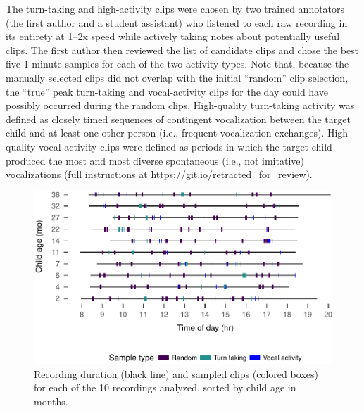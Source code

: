 \documentclass[floatsintext,man]{apa6}
\theoremstyle{definition}
\theoremstyle{definition}
\theoremstyle{definition}
\theoremstyle{remark}
\begin{document}
The turn-taking and high-activity clips were chosen by two trained
annotators (the first author and a student assistant) who listened to
each raw recording in its entirety at 1--2x speed while actively taking
notes about potentially useful clips. The first author then reviewed the
list of candidate clips and chose the best five 1-minute samples for
each of the two activity types. Note that, because the manually selected
clips did not overlap with the initial \enquote{random} clip selection,
the \enquote{true} peak turn-taking and vocal-activity clips for the day
could have possibly occurred during the random clips. High-quality
turn-taking activity was defined as closely timed sequences of
contingent vocalization between the target child and at least one other
person (i.e., frequent vocalization exchanges). High-quality vocal
activity clips were defined as periods in which the target child
produced the most and most diverse spontaneous (i.e., not imitative)
vocalizations (full instructions at
\url{https://git.io/retracted_for_review}).

\begin{figure}
\centering
\includegraphics{Tseltal-CLE_files/figure-latex/fig2-1.pdf}
\caption{\label{fig:fig2}Recording duration (black line) and sampled clips
(colored boxes) for each of the 10 recordings analyzed, sorted by child
age in months.}
\end{figure}
\end{document}
